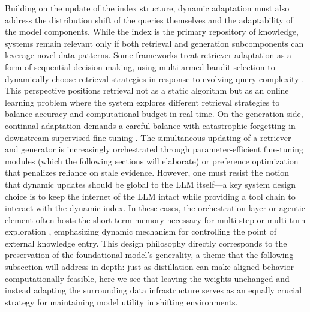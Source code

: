 \documentclass[11pt,a4paper]{article}
\begin{document}
Building on the update of the index structure, dynamic adaptation must also address the distribution shift of the queries themselves and the adaptability of the model components. While the index is the primary repository of knowledge, systems remain relevant only if both retrieval and generation subcomponents can leverage novel data patterns. Some frameworks treat retriever adaptation as a form of sequential decision-making, using multi-armed bandit selection to dynamically choose retrieval strategies in response to evolving query complexity \cite{arxiv:2501.00332v1} \cite{arxiv:2412.01572v4}. This perspective positions retrieval not as a static algorithm but as an online learning problem where the system explores different retrieval strategies to balance accuracy and computational budget in real time. On the generation side, continual adaptation demands a careful balance with catastrophic forgetting in downstream supervised fine-tuning \cite{arxiv:2509.03934v1}. The simultaneous updating of a retriever and generator is increasingly orchestrated through parameter-efficient fine-tuning modules (which the following sections will elaborate) or preference optimization that penalizes reliance on stale evidence. However, one must resist the notion that dynamic updates should be global to the LLM itself---a key system design choice is to keep the internet of the LLM intact while providing a tool chain to interact with the dynamic index. In these cases, the orchestration layer or agentic element often hosts the short-term memory necessary for multi-step or multi-turn exploration \cite{arxiv:2510.13910v2,arxiv:2412.05838v1}, emphasizing dynamic mechanism for controlling the point of external knowledge entry. This design philosophy directly corresponds to the preservation of the foundational model's generality, a theme that the following subsection will address in depth: just as distillation can make aligned behavior computationally feasible, here we see that leaving the weights unchanged and instead adapting the surrounding data infrastructure serves as an equally crucial strategy for maintaining model utility in shifting environments.
\end{document}

